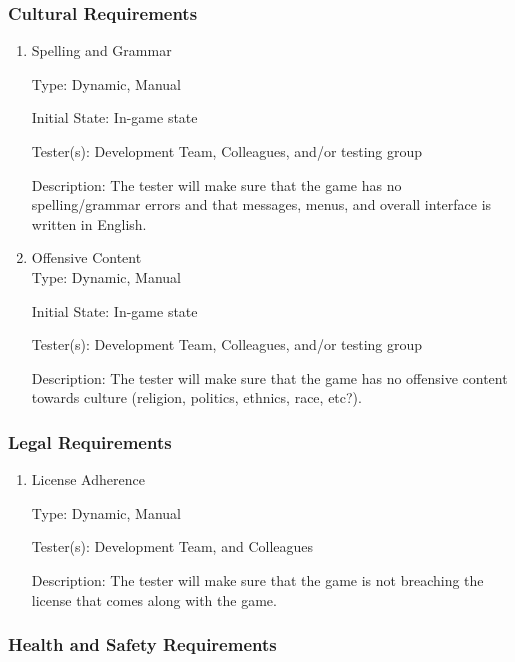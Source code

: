\documentclass[12pt, titlepage]{article}
\begin{document}
\subsubsection{Cultural Requirements}

\begin{enumerate}

\item{Spelling and Grammar\\}

Type: Dynamic, Manual

Initial State: In-game state

Tester(s): Development Team, Colleagues, and/or testing group

Description: The tester will make sure that the game has no spelling/grammar errors and that messages, menus, and overall interface is written in English.

\item{Offensive Content\\}
Type: Dynamic, Manual

Initial State: In-game state

Tester(s): Development Team, Colleagues, and/or testing group

Description: The tester will make sure that the game has no offensive content towards culture (religion, politics, ethnics, race, etc?).

\end{enumerate}

\subsubsection{Legal Requirements}

\begin{enumerate}

\item{License Adherence\\}

Type: Dynamic, Manual

Tester(s): Development Team, and Colleagues

Description: The tester will make sure that the game is not breaching the license that comes along with the game.

\end{enumerate}

\subsubsection{Health and Safety Requirements}
\end{document}
